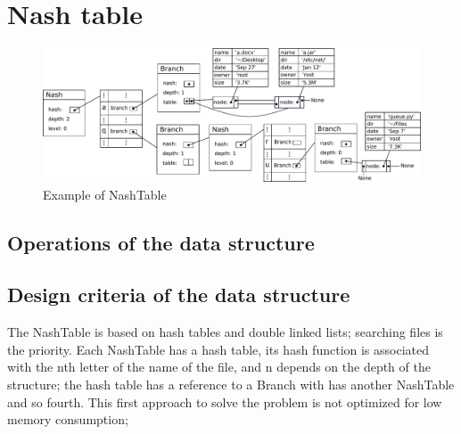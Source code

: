 \documentclass{sig-alternate-05-2015}
\begin{document}
  \section{Nash table}
  \begin{figure}[t]
    \centering
    \includegraphics[scale=0.4]{NashTable.pdf}
    \caption{Example of NashTable}
    \label{img:nashT}
  \end{figure}

  \subsection{Operations of the data structure}

  \subsection{Design criteria of the data structure}
    The NashTable is based on hash tables and double linked lists; searching files
    is the priority. Each NashTable has a hash table, its hash function is associated with the
    nth letter of the name of the file, and n depends on the depth of the structure;
    the hash table has a reference to a Branch with has another NashTable and so fourth.
    This first approach to solve the problem is not optimized for low memory consumption; 



  
  
\end{document}
